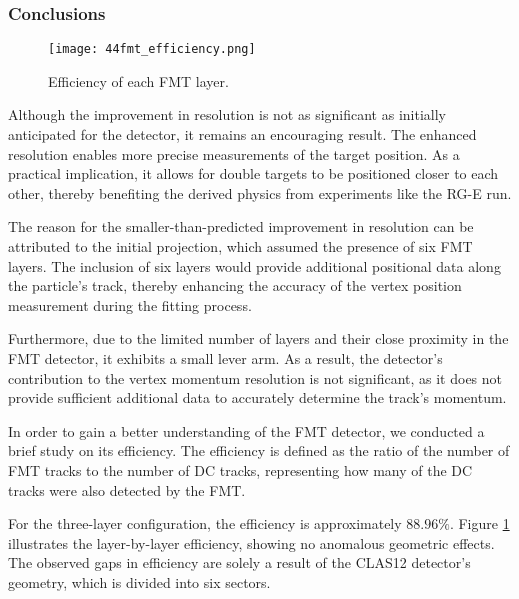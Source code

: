 \subsubsection{Conclusions}
\label{12.44::conclusions}

    \begin{figure}[b]
        \texttt{[image: 44fmt\_efficiency.png]}
        \caption[FMT layers efficiency]
        {Efficiency of each FMT layer.}
        \label{fig::12.44::fmt_azimuthal_efficiency}
    \end{figure}

    Although the improvement in resolution is not as significant as initially anticipated for the detector, it remains an encouraging result.
    The enhanced resolution enables more precise measurements of the target position.
    As a practical implication, it allows for double targets to be positioned closer to each other, thereby benefiting the derived physics from experiments like the RG-E run.

    The reason for the smaller-than-predicted improvement in resolution can be attributed to the initial projection, which assumed the presence of six FMT layers.
    The inclusion of six layers would provide additional positional data along the particle's track, thereby enhancing the accuracy of the vertex position measurement during the fitting process.

    Furthermore, due to the limited number of layers and their close proximity in the FMT detector, it exhibits a small lever arm.
    As a result, the detector's contribution to the vertex momentum resolution is not significant, as it does not provide sufficient additional data to accurately determine the track's momentum.

    In order to gain a better understanding of the FMT detector, we conducted a brief study on its efficiency.
    The efficiency is defined as the ratio of the number of FMT tracks to the number of DC tracks, representing how many of the DC tracks were also detected by the FMT.

    For the three-layer configuration, the efficiency is approximately $88.96\%$.
    Figure \ref{fig::12.44::fmt_azimuthal_efficiency} illustrates the layer-by-layer efficiency, showing no anomalous geometric effects.
    The observed gaps in efficiency are solely a result of the CLAS12 detector's geometry, which is divided into six sectors.
